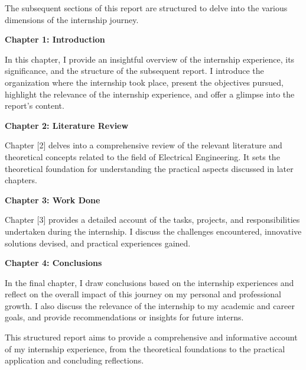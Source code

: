 The subsequent sections of this report are structured to delve into the various dimensions of the internship journey.

\textbf{Chapter 1: Introduction}

In this chapter, I provide an insightful overview of the internship experience, its significance, and the structure of the subsequent report. I introduce the organization where the internship took place, present the objectives pursued, highlight the relevance of the internship experience, and offer a glimpse into the report's content.

\textbf{Chapter 2: Literature Review}

Chapter [2] delves into a comprehensive review of the relevant literature and theoretical concepts related to the field of Electrical Engineering. It sets the theoretical foundation for understanding the practical aspects discussed in later chapters.

\textbf{Chapter 3: Work Done}

Chapter [3] provides a detailed account of the tasks, projects, and responsibilities undertaken during the internship. I discuss the challenges encountered, innovative solutions devised, and practical experiences gained.

\textbf{Chapter 4: Conclusions}

In the final chapter, I draw conclusions based on the internship experiences and reflect on the overall impact of this journey on my personal and professional growth. I also discuss the relevance of the internship to my academic and career goals, and provide recommendations or insights for future interns.

This structured report aims to provide a comprehensive and informative account of my internship experience, from the theoretical foundations to the practical application and concluding reflections.
